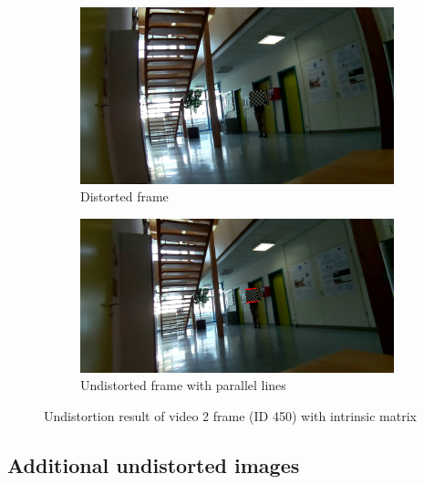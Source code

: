 \begin{figure}[h]
    \centering
    \begin{subfigure}[b]{0.48\textwidth}
        \centering
        \includegraphics[width=\textwidth]{figures/img_v2_0.jpg}
        \caption{Distorted frame}
    \end{subfigure}
    \hfill
    \begin{subfigure}[b]{0.48\textwidth}
        \centering
        \includegraphics[width=\textwidth]{figures/img_v2_5.jpg}
        \caption{Undistorted frame with parallel lines}
    \end{subfigure}
    \caption{Undistortion result of video 2 frame (ID 450) with intrinsic matrix}
    \label{fig:dist4}
\end{figure}

\subsection{Additional undistorted images}

